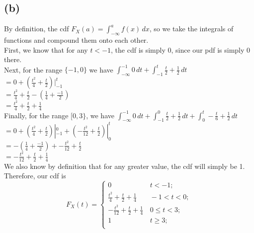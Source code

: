 \documentclass{article}
\begin{document}
{\subsection*{(b)}
By definition, the cdf $F_X(a) = \int_{-\infty}^{a} f(x) \,dx$, so we take the integrals of functions and compound them onto each other. \\
First, we know that for any $t < -1$, the cdf is simply 0, since our pdf is simply 0 there. \\
Next, for the range $\{-1, 0\}$ we have $\int_{-\infty}^{-1} 0 \,dt + \int_{-1}^{t} \frac{t}{2} + \frac{1}{2} \,dt$ \\
$ = 0 + (\frac{t^2}{4} + \frac{t}{2}) |_{-1}^{t}$ \\ 
$ = \frac{t^2}{4} + \frac{t}{2} - (\frac{1}{4} + \frac{-1}{2})$ \\
$ = \frac{t^2}{4} + \frac{t}{2} + \frac{1}{4}$ \\ 
Finally, for the range $[0, 3\}$, we have $\int_{-\infty}^{-1} 0 \,dt + \int_{-1}^{0} \frac{t}{2}+ \frac{1}{2} \,dt + \int_{0}^{t} -\frac{t}{6} + \frac{1}{2} \,dt$ \\
$= 0 + (\frac{t^2}{4} + \frac{t}{2}) |_{-1}^{0} + (-\frac{t^2}{12} + \frac{t}{2}) |_{0}^{t}$ \\
$= -(\frac{1}{4} + \frac{-1}{2}) + -\frac{t^2}{12} + \frac{t}{2}$ \\
$=  -\frac{t^2}{12} + \frac{t}{2} + \frac{1}{4}$ \\
We also know by definition that for any greater value, the cdf will simply be 1. \\
Therefore, our cdf is 
\[
F_{X}\left(t\right)=\begin{cases}
0 & \,t<-1;\\
\frac{t^2}{4} + \frac{t}{2} + \frac{1}{4} & \,-1<t<0;\\
-\frac{t^2}{12} + \frac{t}{2} + \frac{1}{4} & \,0 \leq t < 3;\\
1 & \,t\geq 3;\\
\end{cases}
\]

}
\end{document}
